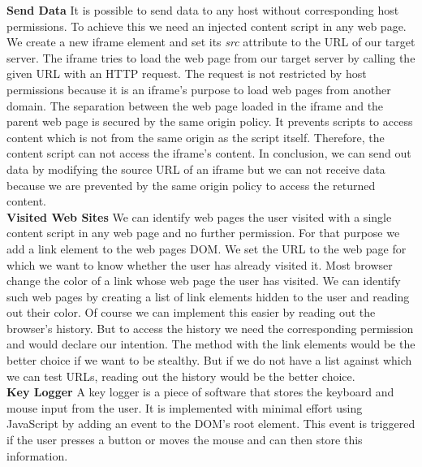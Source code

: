 \documentclass[article,colorback,accentcolor=tud9c,type=bsc]{tudthesis}
\begin{document}
	\textbf{Send Data} It is possible to send data to any host without corresponding host permissions. To achieve this we need an injected content script in any web page. We create a new iframe element and set its \textit{src} attribute to the URL of our target server. The iframe tries to load the web page from our target server by calling the given URL with an HTTP request. The request is not restricted by host permissions because it is an iframe's purpose to load web pages from another domain. The separation between the web page loaded in the iframe and the parent web page is secured by the same origin policy. It prevents scripts to access content which is not from the same origin as the script itself. Therefore, the content script can not access the iframe's content. In conclusion, we can send out data by modifying the source URL of an iframe but we can not receive data because we are prevented by the same origin policy to access the returned content. \\

	\textbf{Visited Web Sites} We can identify web pages the user visited with a single content script in any web page and no further permission. For that purpose we add a link element to the web pages DOM. We set the URL to the web page for which we want to know whether the user has already visited it. Most browser change the color of a link whose web page the user has visited. We can identify such web pages by creating a list of link elements hidden to the user and reading out their color. Of course we can implement this easier by reading out the browser's history. But to access the history we need the corresponding permission and would declare our intention. The method with the link elements would be the better choice if we want to be stealthy. But if we do not have a list against which we can test URLs, reading out the history would be the better choice. \\

	\textbf{Key Logger} A key logger is a piece of software that stores the keyboard and mouse input from the user. It is implemented with minimal effort using JavaScript by adding an event to the DOM's root element. This event is triggered if the user presses a button or moves the mouse and can then store this information. \\
\end{document}
